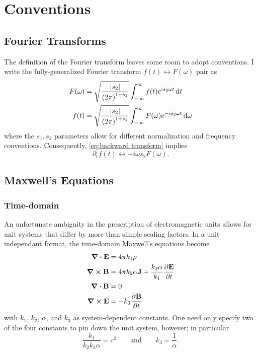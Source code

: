 \chapter{Conventions}

\section{Fourier Transforms\label{sec:general transform}}

The definition of the Fourier transform leaves some room to adopt conventions.
I write the fully-generalized Fourier transform $f(t) \leftrightarrow F(\omega)$ pair as
\begin{subequations}
  \begin{align}
    F(\omega) &= \sqrt{\frac{\abs{s_2}}{\qty(2\pi)^{1-s_1}}} \int_{-\infty}^{\infty} f(t) e^{i s_2 \omega t} \dd{t} \label{eq:forward transform} \\
    f(t) &= \sqrt{\frac{\abs{s_2}}{\qty(2\pi)^{1+s_1}}} \int_{-\infty}^{\infty} F(\omega) e^{- i s_2 \omega t} \dd{\omega} \label{eq:backward transform}
  \end{align}
\end{subequations}
where the $s_1, s_2$ parameters allow for different normalization and frequency conventions. 
Consequently, \cref{eq:backward transform} implies
\begin{equation}
  \partial_t f(t) \leftrightarrow -i \omega s_2 F(\omega).
\end{equation}

\section{Maxwell's Equations}

\subsection{Time-domain}
An unfortunate ambiguity in the prescription of electromagnetic units allows for unit systems that differ by more than simple scaling factors.
In a unit-independant format, the time-domain Maxwell's equations become
\begin{subequations}
  \begin{align}
    \div{\vb{E}} &= 4 \pi k_1 \rho \label{eq:gauss} \\
    \curl{\vb{B}} &= 4 \pi k_2 \alpha \vb{J} + \frac{k_2 \alpha}{k_1} \pdv{\vb{E}}{t} \label{eq:ampere}\\
    \div{\vb{B}} &= 0 \label{eq:no monopoles} \\
    \curl{\vb{E}} &= - k_3 \pdv{\vb{B}}{t} \label{eq:faraday}
  \end{align}
  \label{eq:time-domain maxwell equations}
\end{subequations}
with $k_1$, $k_2$, $\alpha$, and $k_3$ as system-dependent constants. 
One need only specify two of the four constants to pin down the unit system, however; in particular 
\begin{equation}
  \frac{k_1}{k_2 k_3 \alpha} = c^2 \qquad \text{and} \qquad  k_3 = \frac{1}{\alpha}.
\end{equation}

